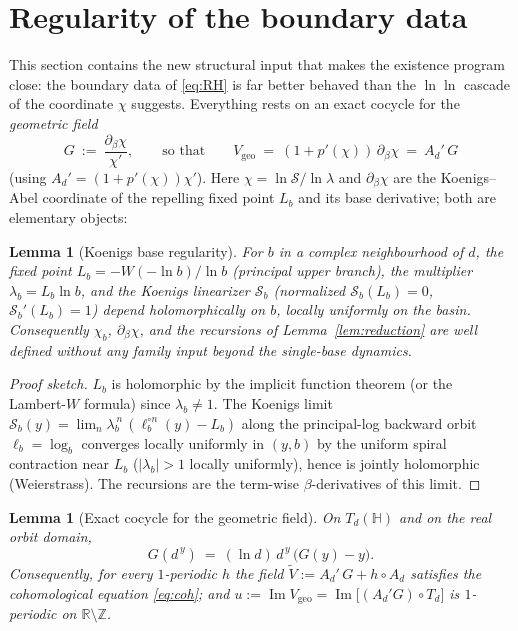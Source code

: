 \documentclass[11pt]{article}
\newtheorem{lemma}[theorem]{Lemma}
\newcommand{\R}{\mathbb{R}}
\newcommand{\Z}{\mathbb{Z}}
\newcommand{\Hup}{\mathbb{H}}
\newcommand{\Sk}{\mathcal S}
\begin{document}
\section{Regularity of the boundary data}\label{sec:data}

This section contains the new structural input that makes the existence
program close: the boundary data of \eqref{eq:RH} is far better behaved
than the $\ln\ln$ cascade of the coordinate $\chi$ suggests.  Everything
rests on an exact cocycle for the \emph{geometric field}
\[
  G\ :=\ \frac{\partial_\beta\chi}{\chi'},
  \qquad\text{so that}\qquad
  V_{\mathrm{geo}}\ =\ (1+p'(\chi))\,\partial_\beta\chi
  \ =\ A_d'\,G
\]
(using $A_d'=(1+p'(\chi))\chi'$).  Here $\chi=\ln\Sk/\ln\lambda$ and
$\partial_\beta\chi$ are the Koenigs--Abel coordinate of the repelling
fixed point $L_b$ and its base derivative; both are elementary objects:

\begin{lemma}[Koenigs base regularity]\label{lem:koenigs-beta}
For $b$ in a complex neighbourhood of $d$, the fixed point
$L_b=-W(-\ln b)/\ln b$ (principal upper branch), the multiplier
$\lambda_b=L_b\ln b$, and the Koenigs linearizer $\Sk_b$ (normalized
$\Sk_b(L_b)=0$, $\Sk_b'(L_b)=1$) depend holomorphically on $b$, locally
uniformly on the basin.  Consequently $\chi_b$, $\partial_\beta\chi$, and
the recursions of Lemma~\ref{lem:reduction} are well defined without any
family input beyond the single-base dynamics.
\end{lemma}

\begin{proof}[Proof sketch]
$L_b$ is holomorphic by the implicit function theorem (or the Lambert-$W$
formula) since $\lambda_b\ne1$.  The Koenigs limit
$\Sk_b(y)=\lim_n\lambda_b^{\,n}\,(\ell_b^{\circ n}(y)-L_b)$ along the
principal-log backward orbit $\ell_b=\log_b$ converges locally uniformly
in $(y,b)$ by the uniform spiral contraction near $L_b$
($|\lambda_b|>1$ locally uniformly), hence is jointly holomorphic
(Weierstrass).  The recursions are the term-wise $\beta$-derivatives of
this limit.
\end{proof}

\begin{lemma}[Exact cocycle for the geometric field]\label{lem:cocycle}
On $T_d(\Hup)$ and on the real orbit domain,
\begin{equation}\label{eq:Gcoc}
  G(d^{\,y})\ =\ (\ln d)\,d^{\,y}\,\bigl(G(y)-y\bigr).
\end{equation}
Consequently, for \emph{every} $1$-periodic $h$ the field
$\widetilde V:=A_d'\,G+h\circ A_d$ satisfies the cohomological equation
\eqref{eq:coh}; and $u:=\operatorname{Im}V_{\mathrm{geo}}
=\operatorname{Im}\bigl[(A_d'G)\circ T_d\bigr]$ is $1$-periodic on
$\R\setminus\Z$.
\end{lemma}
\end{document}
